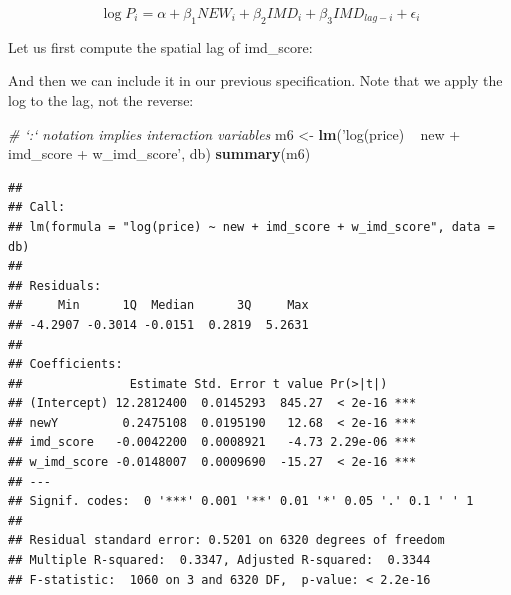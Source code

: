 \documentclass[
]{book}
\newenvironment{Shaded}{\begin{snugshade}}{\end{snugshade}}
\newcommand{\CommentTok}[1]{\textcolor[rgb]{0.56,0.35,0.01}{\textit{#1}}}
\newcommand{\KeywordTok}[1]{\textcolor[rgb]{0.13,0.29,0.53}{\textbf{#1}}}
\newcommand{\NormalTok}[1]{#1}
\newcommand{\OperatorTok}[1]{\textcolor[rgb]{0.81,0.36,0.00}{\textbf{#1}}}
\newcommand{\StringTok}[1]{\textcolor[rgb]{0.31,0.60,0.02}{#1}}
\begin{document}
\[
\log{P_i} = \alpha + \beta_{1} NEW_i + \beta_{2} IMD_i + \beta_{3} IMD_{lag-i} + \epsilon_i
\]

Let us first compute the spatial lag of imd\_score:

\begin{Shaded}
\end{Shaded}

And then we can include it in our previous specification. Note that we apply the log to the lag, not the reverse:

\begin{Shaded}
\begin{Highlighting}[]
\CommentTok{# `:` notation implies interaction variables}
\NormalTok{m6 <-}\StringTok{ }\KeywordTok{lm}\NormalTok{(}\StringTok{'log(price) ~ new + imd_score + w_imd_score'}\NormalTok{, db)}
\KeywordTok{summary}\NormalTok{(m6)}
\end{Highlighting}
\end{Shaded}

\begin{verbatim}
## 
## Call:
## lm(formula = "log(price) ~ new + imd_score + w_imd_score", data = db)
## 
## Residuals:
##     Min      1Q  Median      3Q     Max 
## -4.2907 -0.3014 -0.0151  0.2819  5.2631 
## 
## Coefficients:
##               Estimate Std. Error t value Pr(>|t|)    
## (Intercept) 12.2812400  0.0145293  845.27  < 2e-16 ***
## newY         0.2475108  0.0195190   12.68  < 2e-16 ***
## imd_score   -0.0042200  0.0008921   -4.73 2.29e-06 ***
## w_imd_score -0.0148007  0.0009690  -15.27  < 2e-16 ***
## ---
## Signif. codes:  0 '***' 0.001 '**' 0.01 '*' 0.05 '.' 0.1 ' ' 1
## 
## Residual standard error: 0.5201 on 6320 degrees of freedom
## Multiple R-squared:  0.3347, Adjusted R-squared:  0.3344 
## F-statistic:  1060 on 3 and 6320 DF,  p-value: < 2.2e-16
\end{verbatim}
\end{document}
